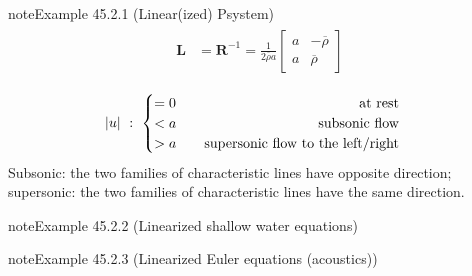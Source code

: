 \documentclass[letterpaper,10pt,english]{jupyterBook}
\begin{document}
\begin{sphinxadmonition}{note}{Example 45.2.1 (Linear(ized) P\sphinxhyphen{}system)}
\begin{equation*}
\begin{split}
\begin{aligned}
  \mathbf{L} & = \mathbf{R}^{-1} = \frac{1}{2 \overline{\rho} a} \begin{bmatrix} a & -\overline{\rho} \\ a & \overline{\rho} \end{bmatrix} \\
\end{aligned}\end{split}
\end{equation*}
\sphinxAtStartPar
{}
\begin{equation*}
\begin{split}|u| \ : \  
\begin{cases}
   = 0 \hfill \qquad \text{at rest} \\
   < a \hfill \qquad \text{subsonic flow} \\
   > a \hfill \qquad \text{supersonic flow to the left/right} \\
\end{cases}
\end{split}
\end{equation*}
\sphinxAtStartPar
Subsonic: the two families of characteristic lines have opposite direction; supersonic: the two families of characteristic lines have the same direction.
\end{sphinxadmonition}
\label{ch/pde/hyperbolic-dimensions:example-1}
\begin{sphinxadmonition}{note}{Example 45.2.2 (Linearized shallow water equations)}


\end{sphinxadmonition}
\label{ch/pde/hyperbolic-dimensions:example-2}
\begin{sphinxadmonition}{note}{Example 45.2.3 (Linearized Euler equations (acoustics))}


\end{sphinxadmonition}
\label{ch/pde/hyperbolic-dimensions:example-3}
\end{document}
